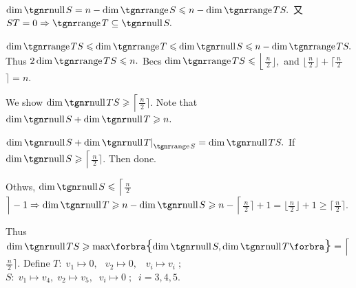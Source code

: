 \Or $\dim\null S=n-\dim\range S\leqslant n-\dim\range TS.$ \;又 $ST=0\Rightarrow\range T\subseteq\null S.$\par\quad
$\dim\range TS\leqslant\dim\range T\leqslant\dim\null S\leqslant n-\dim\range TS.$ \;Thus \;$2\dim\range TS\leqslant n.$\PfEnd\vspace{5pt}\quad
\Or Becs $\dim\range TS\leqslant\Big\lfloor${\Large$\frac{\,n\,}{2}$}$\Big\rfloor,$ and $\Big\lfloor${\Large$\frac{\,n\,}{2}$}$\Big\rfloor+\Big\lceil${\Large$\frac{\,n\,}{2}$}$\Big\rceil=n.$\par\vspace{1pt}\quad
We show $\dim\null TS\geqslant\Big\lceil${\Large$\frac{\,n\,}{2}$}$\Big\rceil.$ Note that $\dim\null S+\dim\null T\geqslant n.$\par\quad
$\dim\null S+\dim\null T\mmid_{\range S}=\dim\null TS.$ \;If $\dim\null S\geqslant\Big\lceil${\Large$\frac{\,n\,}{2}$}$\Big\rceil.$ Then done.\par\vspace{1pt}\quad
Othws, $\dim\null S\leqslant\Big\lceil${\Large$\frac{\,n\,}{2}$}$\Big\rceil-1\Rightarrow\dim\null T\geqslant n-\dim\null S\geqslant n-\Big\lceil${\Large$\frac{\,n\,}{2}$}$\Big\rceil+1=\Big\lfloor${\Large$\frac{\,n\,}{2}$}$\Big\rfloor+1\geqslant\Big\lceil${\Large$\frac{\,n\,}{2}$}$\Big\rceil.$\par\vspace{2pt}\quad
Thus $\dim\null TS\geqslant\max\!\Bra{{\dim\null S,\dim\null T}}=\Big\lceil${\Large$\frac{\,n\,}{2}$}$\Big\rceil.$\PfEnd\vspace{4pt}\quad
\AExa Define $T: \; v_1\mapsto 0, \;\;\, v_2\mapsto 0, \;\;\; v_i\mapsto v_i\;;$ \;\; $S: \; v_1\mapsto v_4, \; v_2\mapsto v_5, \;\; v_i\mapsto 0\;;\;\; i=3,4,5.$\par\vspace{-2pt}
\SepLine


